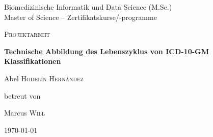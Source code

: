\begin{titlepage}
		\thispagestyle{firstpage}
		\raggedright
		{\Large {\color{orange}Biomedizinische Informatik und Data Science (M.Sc.)\\}
			{\color{gray}Master of Science – Zertifikatskurse/-programme}
			\par}
		\vspace{1cm}
		\centering
		{\scshape\LARGE Projektarbeit\par}
		\vspace{1.5cm}
		{\huge \bfseries Technische Abbildung des Lebenszyklus von ICD-10-GM Klassifikationen\par}
		\vspace{2cm}
		{\Large Abel \textsc{Hodel\'in Hern\'andez}~\par}
		\vfill
		betreut von\par
		Marcus \textsc{Will}
		
		\vfill
		
		{\large \today\par}
	\end{titlepage}